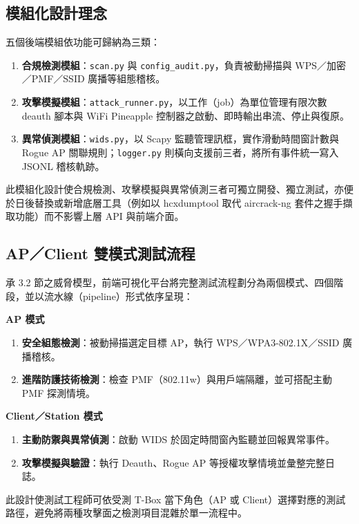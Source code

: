 \documentclass[12pt,a4paper,oneside]{report}
\begin{document}
\subsection{模組化設計理念}
五個後端模組依功能可歸納為三類：
\begin{enumerate}
  \item \textbf{合規檢測模組}：\texttt{scan.py} 與 \texttt{config\_audit.py}，負責被動掃描與 WPS／加密／PMF／SSID 廣播等組態稽核。
  \item \textbf{攻擊模擬模組}：\texttt{attack\_runner.py}，以工作（job）為單位管理有限次數 deauth 腳本與 WiFi Pineapple 控制器之啟動、即時輸出串流、停止與復原。
  \item \textbf{異常偵測模組}：\texttt{wids.py}，以 Scapy 監聽管理訊框，實作滑動時間窗計數與 Rogue AP 關聯規則；\texttt{logger.py} 則橫向支援前三者，將所有事件統一寫入 JSONL 稽核軌跡。
\end{enumerate}
此模組化設計使合規檢測、攻擊模擬與異常偵測三者可獨立開發、獨立測試，亦便於日後替換或新增底層工具（例如以 hcxdumptool 取代 aircrack-ng 套件之握手擷取功能）而不影響上層 API 與前端介面。

\subsection{AP／Client 雙模式測試流程}
承 3.2 節之威脅模型，前端可視化平台將完整測試流程劃分為兩個模式、四個階段，並以流水線（pipeline）形式依序呈現：

\medskip\noindent\textbf{AP 模式}
\begin{enumerate}[label=(\alph*)]
  \item \textbf{安全組態檢測}：被動掃描選定目標 AP，執行 WPS／WPA3-802.1X／SSID 廣播稽核。
  \item \textbf{進階防護技術檢測}：檢查 PMF（802.11w）與用戶端隔離，並可搭配主動 PMF 探測情境。
\end{enumerate}

\noindent\textbf{Client／Station 模式}
\begin{enumerate}[label=(\alph*)]
  \item \textbf{主動防禦與異常偵測}：啟動 WIDS 於固定時間窗內監聽並回報異常事件。
  \item \textbf{攻擊模擬與驗證}：執行 Deauth、Rogue AP 等授權攻擊情境並彙整完整日誌。
\end{enumerate}

此設計使測試工程師可依受測 T-Box 當下角色（AP 或 Client）選擇對應的測試路徑，避免將兩種攻擊面之檢測項目混雜於單一流程中。
\end{document}
